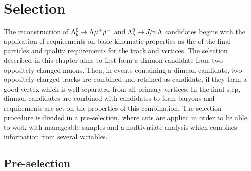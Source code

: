 \chapter{Selection}
\label{sec:Lb_selection}

The reconstruction of ${{\Lambda}^0_{b}}\rightarrow{\ensuremath{\Lambda}}{\ensuremath{\mu^+\mu^-}}$ and $\Lb\to\jpsi\Lz$ candidates begins with the application of
requirements on basic kinematic properties as the \pt of the final particles and quality requirements
for the track and vertices. %
The selection described in this chapter aims to first form a dimuon candidate from two oppositely changed muons. 
Then, in events containing a dimuon candidate, two oppositely charged tracks are combined
and retained as \Lz candidate, if they form a good vertex which is well separated
from all primary vertices. In the final step, dimuon candidates are combined with \Lz candidates to form \Lb
baryons and requirements are set on the properties of this combination. 
The selection procedure is divided in a pre-selection, where cuts are applied in order to be able to work
with manageable samples and a multivariate analysis which combines information from several variables.

\section{Pre-selection}
\label{sec:Lb_stripping}

